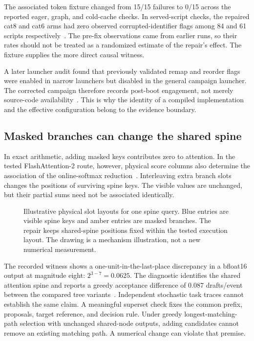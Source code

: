 \documentclass[conference]{IEEEtran}
\begin{document}
The associated token fixture changed from 15/15 failures to 0/15 across the reported eager, graph, and cold-cache checks. In served-script checks, the repaired cat8 and cat6 arms had zero observed corrupted-identifier flags among 84 and 61 scripts respectively~\cite{lumo2026stateless}. The pre-fix observations came from earlier runs, so their rates should not be treated as a randomized estimate of the repair's effect. The fixture supplies the more direct causal witness.

A later launcher audit found that previously validated remap and reorder flags were enabled in narrow launchers but disabled in the general campaign launcher. The corrected campaign therefore records post-boot engagement, not merely source-code availability~\cite{lumo2026archive}. This is why the identity of a compiled implementation and the effective configuration belong to the evidence boundary.

\subsection{Masked branches can change the shared spine}
In exact arithmetic, adding masked keys contributes zero to attention. In the tested FlashAttention-2 route, however, physical score columns also determine the association of the online-softmax reduction~\cite{dao2023flashattention,lumo2026spine}. Interleaving extra branch slots changes the positions of surviving spine keys. The visible values are unchanged, but their partial sums need not be associated identically.

\begin{figure}[t]
\centering

\caption{Illustrative physical slot layouts for one spine query. Blue entries are visible spine keys and amber entries are masked branches. The repair keeps shared-spine positions fixed within the tested execution layout. The drawing is a mechanism illustration, not a new numerical measurement.}
\label{fig:layout}
\end{figure}

The recorded witness shows a one-unit-in-the-last-place discrepancy in a bfloat16 output at magnitude eight: $2^{3-7}=0.0625$. The diagnostic identifies the shared attention spine and reports a greedy acceptance difference of 0.087 drafts/event between the compared tree variants~\cite{lumo2026spine}. Independent stochastic task traces cannot establish the same claim. A meaningful superset check fixes the common prefix, proposals, target reference, and decision rule. Under greedy longest-matching-path selection with unchanged shared-node outputs, adding candidates cannot remove an existing matching path. A numerical change can violate that premise.
\end{document}
